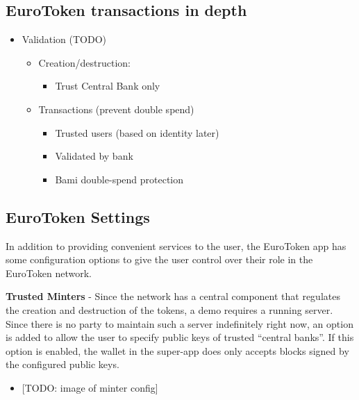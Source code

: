 \documentclass[whitelogo]{tudelft-report}
\providecommand{\tightlist}{%
  \setlength{\itemsep}{0pt}\setlength{\parskip}{0pt}}
\begin{document}
\subsection{EuroToken transactions in
depth}\label{eurotoken-transactions-in-depth}

\begin{itemize}
\tightlist
\item
  Validation (TODO)

  \begin{itemize}
  \tightlist
  \item
    Creation/destruction:

    \begin{itemize}
    \tightlist
    \item
      Trust Central Bank only
    \end{itemize}
  \item
    Transactions (prevent double spend)

    \begin{itemize}
    \tightlist
    \item
      Trusted users (based on identity later)
    \item
      Validated by bank
    \item
      Bami double-spend protection
    \end{itemize}
  \end{itemize}
\end{itemize}

\subsection{EuroToken Settings}\label{eurotoken-settings}

In addition to providing convenient services to the user, the EuroToken
app has some configuration options to give the user control over their
role in the EuroToken network.

\textbf{Trusted Minters} - Since the network has a central component
that regulates the creation and destruction of the tokens, a demo
requires a running server. Since there is no party to maintain such a
server indefinitely right now, an option is added to allow the user to
specify public keys of trusted ``central banks''. If this option is
enabled, the wallet in the super-app does only accepts blocks signed by
the configured public keys.

\begin{itemize}
\tightlist
\item
  {[}TODO: image of minter config{]}
\end{itemize}
\end{document}
